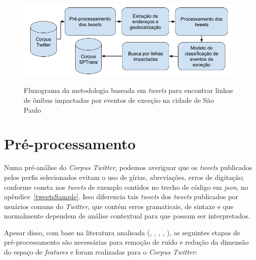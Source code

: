 \documentclass[
	12pt,				%
	oneside,			%
	a4paper,			%
	english,			%
	brazil				%
	]{abntex2ppgsi}
\begin{document}
{{{\begin{figure}[!htb]
	\centering
 	  \caption{Fluxograma da metodologia baseada em \textit{tweets} para encontrar linhas de ônibus impactadas por eventos de exceção na cidade de São Paulo}
		\includegraphics[width=0.7\linewidth]{images/tweet_based_methodology_pt.png}
	\label{fig:tweet_based_methodology}
\end{figure}

\section{Pré-processamento}
\label{preprocessing}

Numa pré-análise do \textit{Corpus Twitter}, podemos averiguar que os \textit{tweets} publicados pelos perfis selecionados evitam o uso de gírias, abreviações, erros de digitação; conforme consta nos \textit{tweets} de exemplo contidos no trecho de código em \textit{json}, no apêndice~\ref{tweetsSample}.  Isso diferencia tais \textit{tweets} dos \textit{tweets} publicados por usuários comuns do \textit{Twitter}, que contém erros gramaticais, de sintaxe e que normalmente dependem de análise contextual para que possam ser interpretados.

Apesar disso, com base na literatura analisada (\cite{Steiger2015Census}, \cite{Middleton2014}, \cite{Kobdani2010}, \cite{Setiawan2017},  \cite{Zagal2016}), as seguintes etapas de pré-processamento são necessárias para remoção de ruído e redução da dimensão do espaço de \textit{features} e foram realizadas para o \textit{Corpus Twitter}:

}}}
\end{document}
